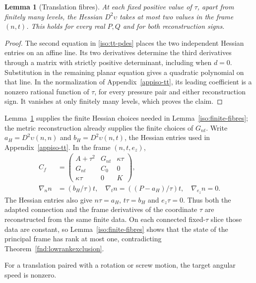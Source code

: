 \documentclass[11pt,a4paper]{article}
\numberwithin{equation}{section}
\theoremstyle{plain}
\newtheorem{lemma}[theorem]{Lemma}
\theoremstyle{definition}
\theoremstyle{remark}
\begin{document}
\begin{lemma}[Translation fibres]\label{iso:tt-fibres}
At each fixed positive value of $\tau$, apart from finitely many levels,
the Hessian $D^2\upsilon$ takes at most two values in the frame $(n,t)$.
This holds for every real $P,Q$ and for both reconstruction signs.
\end{lemma}
\begin{proof}
The second equation in \eqref{iso:tt-pdes} places the two independent
Hessian entries on an affine line. Its two derivatives determine the
third derivatives through a matrix with strictly positive determinant,
including when $d=0$. Substitution in the remaining planar equation
gives a quadratic polynomial on that line. In the normalization of
Appendix~\ref{appiso-tt}, its leading coefficient is a nonzero rational
function of $\tau$, for every pressure pair and either reconstruction
sign. It vanishes at only finitely many levels, which proves the claim.
\end{proof}

Lemma~\ref{iso:tt-fibres} supplies the finite Hessian choices needed in
Lemma~\ref{iso:finite-fibres}; the metric reconstruction already supplies
the finite choices of $G_{nt}$.  Write $a_H=D^2\upsilon(n,n)$ and
$b_H=D^2\upsilon(n,t)$, the Hessian entries used in
Appendix~\ref{appiso-tt}.  In the frame $(n,t,e_z)$,
\[
 \begin{aligned}
 C_f&=\begin{pmatrix}A+\tau^2&G_{nt}&\kappa\tau\\G_{nt}&C_0&0\\
 \kappa\tau&0&K\end{pmatrix},\\
 \nabla_n n&=(b_H/\tau)t,\quad
 \nabla_t n=((P-a_H)/\tau)t,\quad \nabla_{e_z}n=0.
 \end{aligned}
\]
The Hessian entries also give $n\tau=a_H$, $t\tau=b_H$ and $e_z\tau=0$.
Thus both the adapted connection and the frame derivatives of the
coordinate $\tau$ are reconstructed from the same finite data.
On each connected fixed-$\tau$ slice those data are constant, so
Lemma~\ref{iso:finite-fibres} shows that the state of the principal frame
has rank at most one, contradicting Theorem~\ref{fnd:lowrankexclusion}.

For a translation paired with a rotation or screw motion, the target
angular speed is nonzero.
\end{document}
